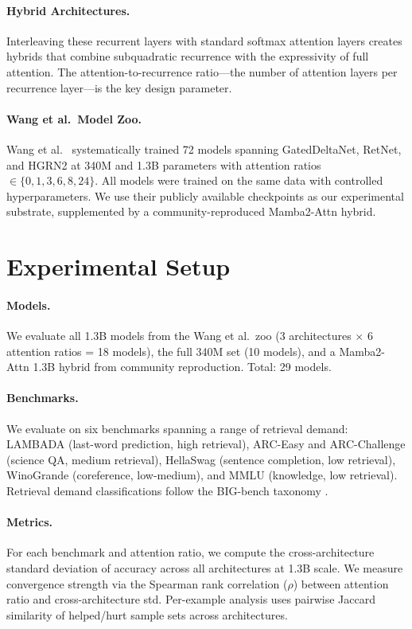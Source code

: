 \documentclass[11pt,twocolumn,a4paper]{article}
\begin{document}
\paragraph{Hybrid Architectures.} Interleaving these recurrent layers with standard softmax attention layers creates hybrids that combine subquadratic recurrence with the expressivity of full attention. The attention-to-recurrence ratio---the number of attention layers per recurrence layer---is the key design parameter.

\paragraph{Wang et al.\ Model Zoo.} Wang et al.\ \cite{wang2025mamba} systematically trained 72 models spanning GatedDeltaNet, RetNet, and HGRN2 at 340M and 1.3B parameters with attention ratios $\in \{0, 1, 3, 6, 8, 24\}$. All models were trained on the same data with controlled hyperparameters. We use their publicly available checkpoints as our experimental substrate, supplemented by a community-reproduced Mamba2-Attn hybrid.

\section{Experimental Setup}

\paragraph{Models.} We evaluate all 1.3B models from the Wang et al.\ zoo (3 architectures $\times$ 6 attention ratios = 18 models), the full 340M set (10 models), and a Mamba2-Attn 1.3B hybrid from community reproduction. Total: 29 models.

\paragraph{Benchmarks.} We evaluate on six benchmarks spanning a range of retrieval demand: LAMBADA (last-word prediction, high retrieval), ARC-Easy and ARC-Challenge (science QA, medium retrieval), HellaSwag (sentence completion, low retrieval), WinoGrande (coreference, low-medium), and MMLU (knowledge, low retrieval). Retrieval demand classifications follow the BIG-bench taxonomy \cite{srivastava2023beyond}.

\paragraph{Metrics.} For each benchmark and attention ratio, we compute the cross-architecture standard deviation of accuracy across all architectures at 1.3B scale. We measure convergence strength via the Spearman rank correlation ($\rho$) between attention ratio and cross-architecture std. Per-example analysis uses pairwise Jaccard similarity of helped/hurt sample sets across architectures.
\end{document}
